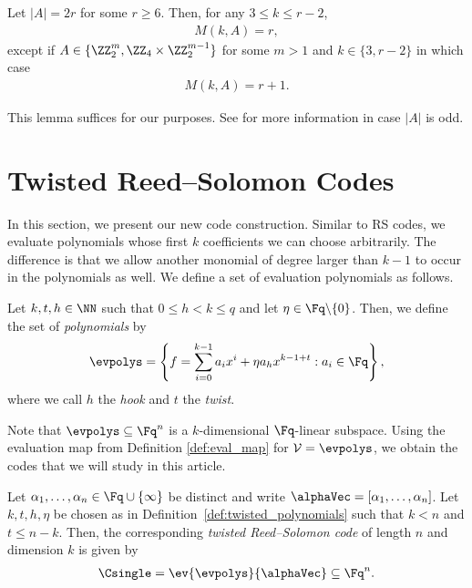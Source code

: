 \documentclass[conference,a4paper]{IEEEtran}
\begin{document}
\begin{lemma}\label{lem:tsum_roth_theorem_even_order}
Let $|A|= 2r$ for some $r \geq 6$. Then, for any $3 \leq k \leq r-2$,
\begin{align*}
M(k,A) = r,
\end{align*}
except if $A \in \{\ZZ_2^m,\ZZ_4 \times \ZZ_2^{m-1}\}$ for some $m > 1$ and $k \in \{3,r-2\}$ in which case
\begin{align*}
M(k,A) = r+1.
\end{align*}
\end{lemma}
This lemma suffices for our purposes. See \cite{roth_construction_1989, roth_t-sum_1992} for more information in case $|A|$ is odd.



\section{Twisted Reed--Solomon Codes}\label{sec:CTRS_one_twist}

\noindent
In this section, we present our new code construction.
Similar to RS codes, we evaluate polynomials whose first $k$ coefficients we can choose arbitrarily.
The difference is that we allow another monomial of degree larger than $k-1$ to occur in the polynomials as well.
We define a set of evaluation polynomials as follows.

\begin{definition}\label{def:twisted_polynomials}
Let $k,t,h \in \NN$ such that $0 \le h<k\leq q$ and let $\eta \in \Fq \backslash \{0\}$. Then, we define the set of \emph{\twisted polynomials} by
\begin{align*}
\evpolys = \left\{ f = \sum_{i=0}^{k-1} a_i x^i + \eta a_h x^{k-1+t} : a_i \in \Fq \right\},
\end{align*}
where we call $h$ the \emph{hook} and $t$ the \emph{twist}.
\end{definition}

Note that $\evpolys \subseteq \Fq^n$ is a $k$-dimensional $\Fq$-linear subspace. Using the evaluation map from Definition \ref{def:eval_map} for $\mathcal{V}=\evpolys$, we obtain the codes that we will study in this article.

\begin{definition}\label{def:CTRS_one_twist}
Let $\alpha_1,\dots,\alpha_n \in \Fq \cup \{\infty\}$ be distinct and write $\alphaVec = [\alpha_1,\dots,\alpha_n]$.
Let $k,t,h,\eta$ be chosen as in Definition~\ref{def:twisted_polynomials} such that $k<n$ and $t \leq n-k$. Then, the corresponding \emph{twisted Reed--Solomon code} of length $n$ and dimension $k$ is given by
\begin{align*}
\Csingle = \ev{\evpolys}{\alphaVec} \subseteq \Fq^n.
\end{align*}
\end{definition}
\end{document}
